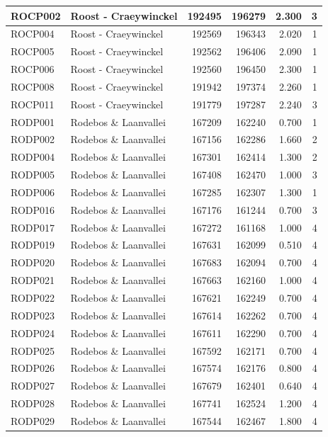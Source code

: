 \documentclass[11pt,]{book}
\begin{document}
\begin{table}
\begin{tabular}[t]{l|l|r|r|r|r}
\hline
ROCP002 & Roost - Craeywinckel & 192495 & 196279 & 2.300 & 3\\
\hline
ROCP004 & Roost - Craeywinckel & 192569 & 196343 & 2.020 & 1\\
\hline
ROCP005 & Roost - Craeywinckel & 192562 & 196406 & 2.090 & 1\\
\hline
ROCP006 & Roost - Craeywinckel & 192560 & 196450 & 2.300 & 1\\
\hline
ROCP008 & Roost - Craeywinckel & 191942 & 197374 & 2.260 & 1\\
\hline
ROCP011 & Roost - Craeywinckel & 191779 & 197287 & 2.240 & 3\\
\hline
RODP001 & Rodebos \& Laanvallei & 167209 & 162240 & 0.700 & 1\\
\hline
RODP002 & Rodebos \& Laanvallei & 167156 & 162286 & 1.660 & 2\\
\hline
RODP004 & Rodebos \& Laanvallei & 167301 & 162414 & 1.300 & 2\\
\hline
RODP005 & Rodebos \& Laanvallei & 167408 & 162470 & 1.000 & 3\\
\hline
RODP006 & Rodebos \& Laanvallei & 167285 & 162307 & 1.300 & 1\\
\hline
RODP016 & Rodebos \& Laanvallei & 167176 & 161244 & 0.700 & 3\\
\hline
RODP017 & Rodebos \& Laanvallei & 167272 & 161168 & 1.000 & 4\\
\hline
RODP019 & Rodebos \& Laanvallei & 167631 & 162099 & 0.510 & 4\\
\hline
RODP020 & Rodebos \& Laanvallei & 167683 & 162094 & 0.700 & 4\\
\hline
RODP021 & Rodebos \& Laanvallei & 167663 & 162160 & 1.000 & 4\\
\hline
RODP022 & Rodebos \& Laanvallei & 167621 & 162249 & 0.700 & 4\\
\hline
RODP023 & Rodebos \& Laanvallei & 167614 & 162262 & 0.700 & 4\\
\hline
RODP024 & Rodebos \& Laanvallei & 167611 & 162290 & 0.700 & 4\\
\hline
RODP025 & Rodebos \& Laanvallei & 167592 & 162171 & 0.700 & 4\\
\hline
RODP026 & Rodebos \& Laanvallei & 167574 & 162176 & 0.800 & 4\\
\hline
RODP027 & Rodebos \& Laanvallei & 167679 & 162401 & 0.640 & 4\\
\hline
RODP028 & Rodebos \& Laanvallei & 167741 & 162524 & 1.200 & 4\\
\hline
RODP029 & Rodebos \& Laanvallei & 167544 & 162467 & 1.800 & 4\\

\end{tabular}
\end{table}
\end{document}
